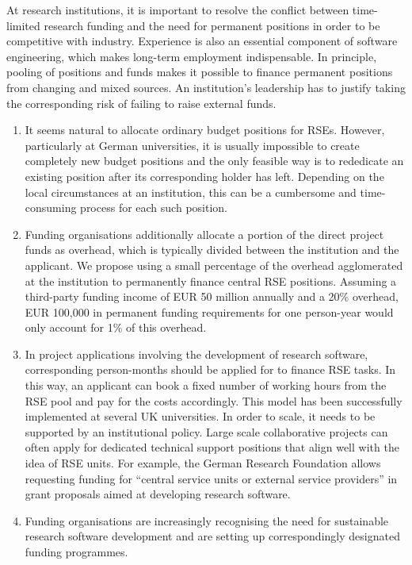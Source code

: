 \documentclass[a4paper]{article}
\begin{document}
At research institutions, it is important to resolve the conflict between time-limited research funding and the need for permanent positions in order to be competitive with industry.
Experience is also an essential component of software engineering, which makes long-term employment indispensable.
In principle, pooling of positions and funds makes it possible to finance permanent positions from changing and mixed sources.
An institution’s leadership has to justify taking the corresponding risk of failing to raise external funds.
\begin{enumerate}
\item It seems natural to allocate ordinary budget positions for RSEs.
      However, particularly at German universities, it is usually impossible to create completely new budget positions and the only feasible way is to rededicate an existing position after its corresponding holder has left.
      Depending on the local circumstances at an institution, this can be a cumbersome and time-consuming process for each such position.
\item Funding organisations additionally allocate a portion of the direct project funds as overhead, which is typically divided between the institution and the applicant.
      We propose using a small percentage of the overhead agglomerated at the institution to permanently finance central RSE positions.
      Assuming a third-party funding income of EUR 50 million annually and a 20\% overhead, EUR 100,000 in permanent funding requirements for one person-year would only account for 1\% of this overhead.
\item In project applications involving the development of research software, corresponding person-months should be applied for to finance RSE tasks.
      In this way, an applicant can book a fixed number of working hours from the RSE pool and pay for the costs accordingly.
      This model has been successfully implemented at several UK universities.
      In order to scale, it needs to be supported by an institutional policy.
      Large scale collaborative projects can often apply for dedicated technical support positions that align well with the idea of RSE units.
      For example, the German Research Foundation allows requesting funding for “central service units or external service providers” in grant proposals aimed at developing research software\autocite{katerbow_dfg_rse_2024}.
\item Funding organisations are increasingly recognising the need for sustainable research software
      development and are setting up correspondingly designated funding programmes.

\end{enumerate}
\end{document}
